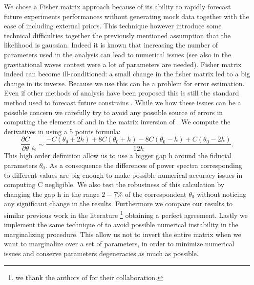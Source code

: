 \documentclass[aps,prd,preprint,groupedaddress]{revtex4-1}
\begin{document}
We chose a Fisher matrix approach because of its ability to rapidly forecast future experiments performances without generating mock data together with the ease of including external priors. 
This technique however introduce some technical difficulties together the previously mentioned assumption that the likelihood is gaussian. 
Indeed it is known \cite{2006astro.ph..9591A} that increasing the number of parameters used in the analysis can lead to numerical issues (see also \cite{2008PhRvD..77d2001V} in the gravitational waves contest were a lot of parameters are needed).
Fisher matrix indeed can become ill-conditioned: a small change in the fisher matrix led to a big change in its inverse. Because we use  this can be a problem for error estimation. 
Even if other methods of analysis have been proposed \cite{2006JCAP...10..013P,2006astro.ph..9591A} this is still the standard method used to forecast future constrains \cite{wu:2014}.
While we how these issues can be a possible concern we carefully try to avoid any possible source of errors in computing the elements of  and in the matrix inversion of .
We compute the derivatives in  using a 5 points formula:
\begin{equation}
\frac{\partial C}{\partial \theta}\bigg|_{\theta_{0}} \sim \frac{-C(\theta_{0}+2h)+8C(\theta_{0}+h)-8C(\theta_{0}-h)+C(\theta_{0}-2h)}{12h}.
\label{eqn:deriv}
\end{equation}
This high order definition allow us to use a bigger gap h around the fiducial parameters $\theta_{0}$. As a consequence the differences of power spectra corresponding to different values are big enough to make possible numerical accuracy issues in computing C negligible.
We also test the robustness of this calculation by changing the gap h in the range $2-7\%$ of the correspondent $\theta_{0}$ without noticing any significant change in the results.
Furthermore we compare our results to similar previous work in the literature \footnote{we thank the authors of \cite{pan:2015} for their collaboration.} obtaining a perfect agreement.
Lastly we implement the same technique of \cite{2006astro.ph..9591A} to avoid possible numerical instability in the marginalizing procedure. This allow us not to invert the entire matrix when we want to marginalize over a set of parameters, in order to minimize numerical issues and conserve parameters degeneracies as much as possible.
\end{document}

